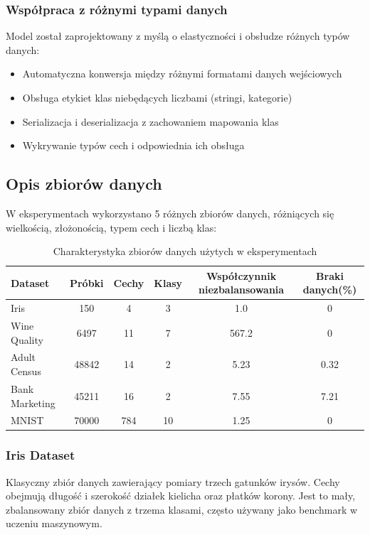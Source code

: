 \documentclass[11pt,a4paper]{article}
\begin{document}
\subsubsection{Współpraca z różnymi typami danych}

Model został zaprojektowany z myślą o elastyczności i obsłudze różnych typów danych:

\begin{itemize}
    \item Automatyczna konwersja między różnymi formatami danych wejściowych
    \item Obsługa etykiet klas niebędących liczbami (stringi, kategorie)
    \item Serializacja i deserializacja z zachowaniem mapowania klas
    \item Wykrywanie typów cech i odpowiednia ich obsługa
\end{itemize}

\subsection{Opis zbiorów danych}

W eksperymentach wykorzystano 5 różnych zbiorów danych, różniących się wielkością, złożonością, typem cech i liczbą klas:

\begin{table}[H]
\caption{Charakterystyka zbiorów danych użytych w eksperymentach}
\label{tab:dataset_comparison}
\begin{tabular}{lccccc}
\toprule
Dataset & Próbki & Cechy & Klasy & Współczynnik niezbalansowania & Braki danych(\%) \\
\midrule
Iris & 150 & 4 & 3 & 1.0 & 0 \\
Wine Quality & 6497 & 11 & 7 & 567.2 & 0 \\
Adult Census & 48842 & 14 & 2 & 5.23 & 0.32 \\
Bank Marketing & 45211 & 16 & 2 & 7.55 & 7.21 \\
MNIST & 70000 & 784 & 10 & 1.25 & 0 \\
\bottomrule
\end{tabular}
\end{table}

\subsubsection{Iris Dataset}
Klasyczny zbiór danych zawierający pomiary trzech gatunków irysów. Cechy obejmują długość i szerokość działek kielicha oraz płatków korony. Jest to mały, zbalansowany zbiór danych z trzema klasami, często używany jako benchmark w uczeniu maszynowym.
\end{document}

